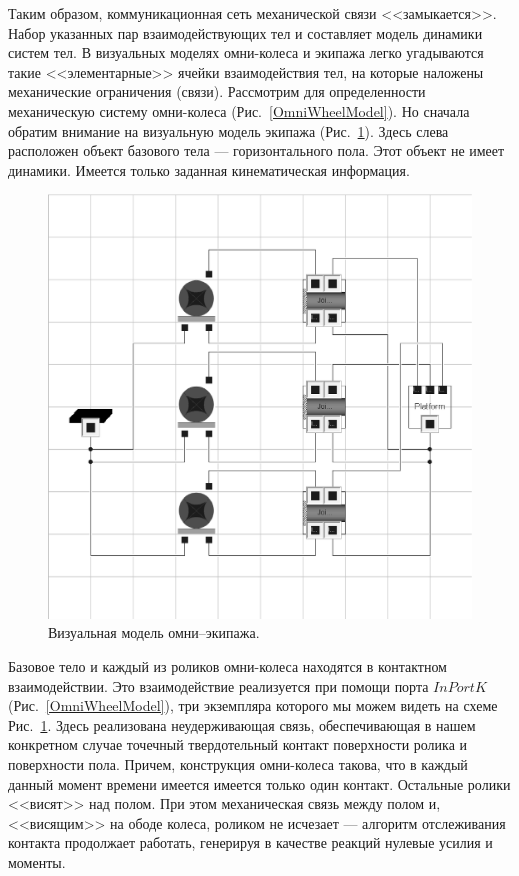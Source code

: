 \documentclass[12pt,a4paper]{article}
\begin{document}
Таким образом, коммуникационная сеть механической связи <<замыкается>>. Набор 
указанных пар взаимодействующих тел и составляет модель динамики систем тел. В
визуальных моделях омни-колеса и экипажа легко угадываются такие 
<<элементарные>> ячейки взаимодействия тел, на которые наложены механические 
ограничения (связи). Рассмотрим для определенности механическую систему 
омни-колеса (Рис.~\ref{OmniWheelModel}). Но сначала обратим внимание на 
визуальную модель экипажа (Рис.~\ref{OmniVehicle}). Здесь слева расположен 
объект базового тела --- горизонтального пола. Этот объект не имеет динамики.
Имеется только заданная кинематическая информация.

\begin{figure}[htb]
\centering\includegraphics[width=15cm]{OmniVehicleModel.eps}
\caption{Визуальная модель омни--экипажа.}
\label{OmniVehicle}
\end{figure}

Базовое тело и каждый из роликов омни-колеса находятся в контактном 
взаимодействии. Это взаимодействие реализуется при помощи порта $InPortK$
(Рис.~\ref{OmniWheelModel}), три экземпляра которого мы можем видеть на схеме
Рис.~\ref{OmniVehicle}. Здесь реализована неудерживающая связь, обеспечивающая 
в нашем конкретном случае точечный твердотельный контакт поверхности ролика и
поверхности пола. Причем, конструкция омни-колеса такова, что в каждый данный 
момент времени имеется имеется только один контакт. Остальные ролики <<висят>>
над полом. При этом механическая связь между полом и, <<висящим>> на ободе
колеса, роликом не исчезает --- алгоритм отслеживания контакта продолжает 
работать, генерируя в качестве реакций нулевые усилия и моменты.
\end{document}
